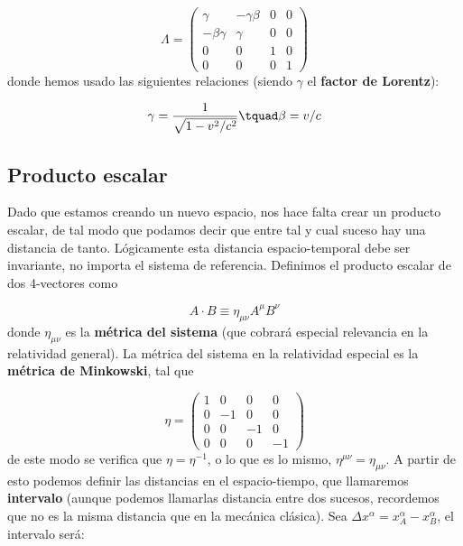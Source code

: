 \begin{equation}
\Lambda = \begin{pmatrix}
\gamma & - \gamma \beta & 0 & 0 \\
 - \beta \gamma &  \gamma  & 0 & 0 \\
0 & 0  & 1 & 0 \\
0 & 0  & 0 & 1
\end{pmatrix}
\end{equation}
donde hemos usado las siguientes relaciones (siendo $\gamma$ el \textbf{factor de Lorentz}):

\begin{equation}
\gamma = \frac{1}{\sqrt{1-v^2/c^2}} \tquad \beta = v/c
\end{equation}

\subsection*{Producto escalar}

Dado que estamos creando un nuevo espacio, nos hace falta crear un producto escalar, de tal modo que podamos decir que entre tal y cual suceso hay una distancia de tanto. Lógicamente esta distancia espacio-temporal debe ser invariante, no importa el sistema de referencia. Definimos el producto escalar de dos 4-vectores como

\begin{equation}
A \cdot B \equiv \eta_{\mu \nu} A^{\mu}  B^{\nu}
\end{equation}
donde $\eta_{\mu \nu}$ es la \textbf{métrica del sistema} (que cobrará especial relevancia en la relatividad general). La métrica del sistema en la relatividad especial es la \textbf{métrica de Minkowski}, tal que 


\begin{equation}
\eta = \begin{pmatrix}
1 & 0 & 0 & 0 \\
 0 &  -1  & 0 & 0 \\
0 & 0  & -1 & 0 \\
0 & 0  & 0 & -1
\end{pmatrix}
\end{equation}
de este modo se verifica que $\eta = \eta^{-1}$, o lo que es lo mismo, $\eta^{\mu \nu} = \eta_{\mu \nu}$. A partir de esto podemos definir las distancias en el espacio-tiempo, que llamaremos \textbf{intervalo} (aunque podemos llamarlas distancia entre dos sucesos, recordemos que no es la misma distancia que en la mecánica clásica). Sea $\Delta x^{\alpha} = x_A^{\alpha}-x_B^{\alpha}$, el intervalo será:

